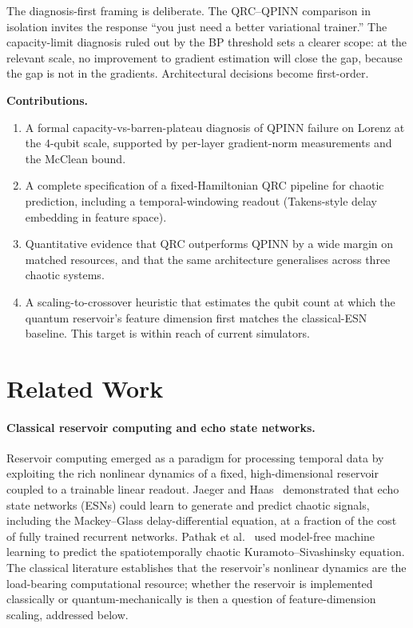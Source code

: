 \documentclass[11pt,a4paper]{article}
\begin{document}
The diagnosis-first framing is deliberate. The QRC--QPINN comparison
in isolation invites the response ``you just need a better variational
trainer.'' The capacity-limit diagnosis ruled out by the BP threshold
sets a clearer scope: at the relevant scale, no improvement to
gradient estimation will close the gap, because the gap is not in the
gradients. Architectural decisions become first-order.

\textbf{Contributions.}
\begin{enumerate}
  \item A formal capacity-vs-barren-plateau diagnosis of QPINN failure
        on Lorenz at the $4$-qubit scale, supported by per-layer
        gradient-norm measurements and the McClean bound.
  \item A complete specification of a fixed-Hamiltonian QRC pipeline
        for chaotic prediction, including a temporal-windowing
        readout (Takens-style delay embedding in feature space).
  \item Quantitative evidence that QRC outperforms QPINN by a wide
        margin on matched resources, and that the same architecture
        generalises across three chaotic systems.
  \item A scaling-to-crossover heuristic that estimates the qubit
        count at which the quantum reservoir's feature dimension
        first matches the classical-ESN baseline. This target is
        within reach of current simulators.
\end{enumerate}

\section{Related Work}

\paragraph{Classical reservoir computing and echo state networks.}
Reservoir computing emerged as a paradigm for processing temporal data
by exploiting the rich nonlinear dynamics of a fixed, high-dimensional
reservoir coupled to a trainable linear readout.
Jaeger and Haas~\cite{jaeger2004harnessing} demonstrated that echo
state networks (ESNs) could learn to generate and predict chaotic
signals, including the Mackey--Glass delay-differential equation, at a
fraction of the cost of fully trained recurrent networks.
Pathak et al.~\cite{pathak2018model} used model-free machine learning
to predict the spatiotemporally chaotic Kuramoto--Sivashinsky equation.
The classical literature establishes that the reservoir's nonlinear
dynamics are the load-bearing computational resource; whether the
reservoir is implemented classically or quantum-mechanically is then
a question of feature-dimension scaling, addressed below.
\end{document}

